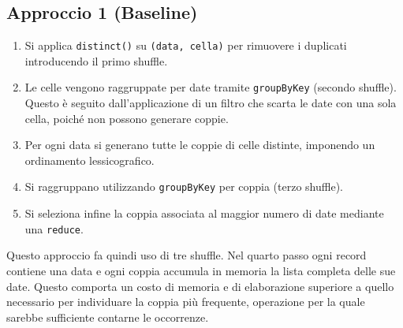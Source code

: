 \documentclass[10pt,a4paper]{article}
\begin{document}
\subsection{Approccio 1 (Baseline)}
\begin{enumerate}
  \item Si applica \texttt{distinct()} su \texttt{(data, cella)} per rimuovere i duplicati introducendo il primo shuffle.
  \item Le celle vengono raggruppate per date tramite \texttt{groupByKey} (secondo shuffle). Questo è seguito dall'applicazione di un filtro che scarta le date con una sola cella, poiché non possono generare coppie.
  \item Per ogni data si generano tutte le coppie di celle distinte, imponendo un ordinamento lessicografico.
  \item Si raggruppano utilizzando \texttt{groupByKey} per coppia (terzo shuffle).
  \item Si seleziona infine la coppia associata al maggior numero di date mediante una \texttt{reduce}.
\end{enumerate}
Questo approccio fa quindi uso di tre shuffle. Nel quarto passo ogni record contiene una data e ogni coppia accumula in memoria la lista completa delle sue date. Questo comporta un costo di memoria e di elaborazione superiore a quello necessario per individuare la coppia più frequente, operazione per la quale sarebbe sufficiente contarne le occorrenze.
\end{document}
